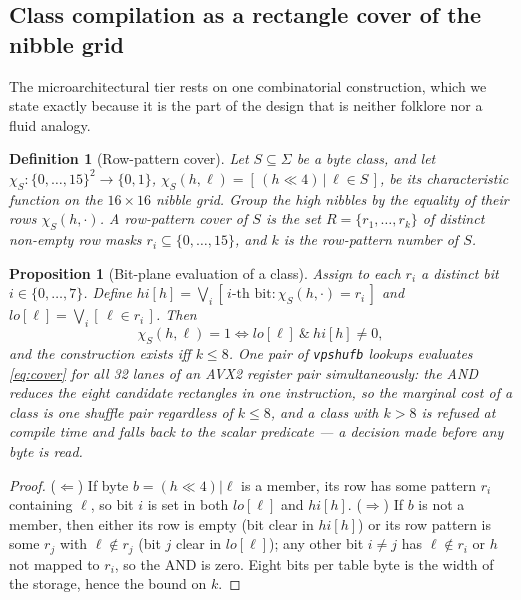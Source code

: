\documentclass[11pt,letterpaper]{article}
\newtheorem{proposition}{Proposition}
\newtheorem{definition}{Definition}
\begin{document}
\subsection{Class compilation as a rectangle cover of the nibble grid}
\label{sec:foundations:cover}
The microarchitectural tier rests on one combinatorial construction, which
we state exactly because it is the part of the design that is neither
folklore nor a fluid analogy.

\begin{definition}[Row-pattern cover]
Let $S\subseteq\Sigma$ be a byte class, and let
$\chi_S:\{0,\dots,15\}^2\to\{0,1\}$,
$\chi_S(h,\ell)=[\,(h{\ll}4)\,|\,\ell \in S\,]$, be its characteristic
function on the $16\times16$ nibble grid. Group the high nibbles by the
equality of their rows $\chi_S(h,\cdot)$. A \emph{row-pattern cover} of
$S$ is the set $R=\{r_1,\dots,r_k\}$ of distinct non-empty row masks
$r_i\subseteq\{0,\dots,15\}$, and $k$ is the row-pattern number of $S$.
\end{definition}

\begin{proposition}[Bit-plane evaluation of a class]
\label{prop:cover}
Assign to each $r_i$ a distinct bit $i\in\{0,\dots,7\}$. Define
$\mathit{hi}[h]=\bigvee_i [\,i\text{-th bit}: \chi_S(h,\cdot)=r_i\,]$ and
$\mathit{lo}[\ell]=\bigvee_i [\,\ell\in r_i\,]$. Then
\begin{equation}
\label{eq:cover}
\chi_S(h,\ell)=1 \iff \mathit{lo}[\ell]\ \&\ \mathit{hi}[h] \neq 0 ,
\end{equation}
and the construction exists \emph{iff} $k\le 8$. One pair of
\texttt{vpshufb} lookups evaluates \eqref{eq:cover} for all 32 lanes of an
AVX2 register pair simultaneously: the AND reduces the eight candidate
rectangles in one instruction, so the marginal cost of a class is one
shuffle pair regardless of $k\le 8$, and a class with $k>8$ is refused at
compile time and falls back to the scalar predicate --- a decision made
before any byte is read.
\end{proposition}

\begin{proof}
($\Leftarrow$) If byte $b=(h{\ll}4)|\ell$ is a member, its row has some
pattern $r_i$ containing $\ell$, so bit $i$ is set in both
$\mathit{lo}[\ell]$ and $\mathit{hi}[h]$. ($\Rightarrow$) If $b$ is not a
member, then either its row is empty (bit clear in $\mathit{hi}[h]$) or its
row pattern is some $r_j$ with $\ell\notin r_j$ (bit $j$ clear in
$\mathit{lo}[\ell]$); any other bit $i\neq j$ has $\ell\notin r_i$ or
$h$ not mapped to $r_i$, so the AND is zero. Eight bits per table byte is
the width of the storage, hence the bound on $k$.
\end{proof}
\end{document}
